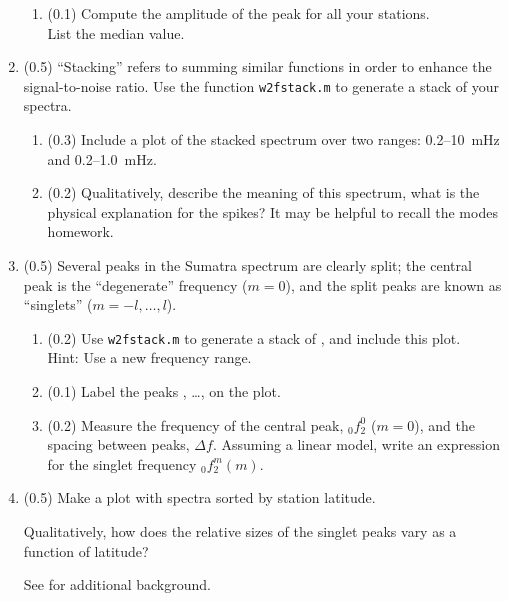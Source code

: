 \documentclass[11pt,titlepage,fleqn]{article}
\begin{document}
\begin{enumerate}
\begin{enumerate}
\item (0.1) Compute the amplitude of the  peak for all your stations. \\
List the median value.
\end{enumerate}


\item (0.5) ``Stacking'' refers to summing similar functions in order to enhance the signal-to-noise ratio. Use the function \verb+w2fstack.m+ to generate a stack of your spectra.
%
\begin{enumerate}
\item (0.3) Include a plot of the stacked spectrum over two ranges: 0.2--10~mHz and 0.2--1.0~mHz.
\item (0.2) Qualitatively, describe the meaning of this spectrum, \eg what is the physical explanation for the spikes? It may be helpful to recall the modes homework.
\end{enumerate}
%


\item (0.5) Several peaks in the Sumatra spectrum are clearly split; the central peak is the ``degenerate'' frequency ($m=0$), and the split peaks are known as ``singlets'' ($m = -l,\ldots,l$). 
%
\begin{enumerate}
\item (0.2) Use \verb+w2fstack.m+ to generate a stack of , and include this plot. \\
Hint: Use a new frequency range.
\item (0.1) Label the peaks , \ldots,  on the plot.
\item (0.2) Measure the frequency of the central peak, $_0f_2^0$ ($m=0$), and the spacing between peaks, $\Delta f$.
Assuming a linear model, write an expression for the singlet frequency $_0f_2^m(m)$.
\end{enumerate}


\item (0.5) Make a plot with   spectra sorted by station latitude.

Qualitatively, how does the relative sizes of the singlet peaks vary as a function of latitude?

See \citet[][Figure 3]{SSteinOkal2007} for additional background.


\end{enumerate}
\end{document}
